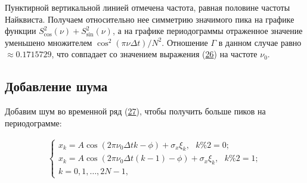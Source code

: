\documentclass[12pt]{article}
\newcommand{\hl}[1]{(\hyperlink{eq:#1}{#1})}
\newcommand{\sd}[1]{\hypertarget{skip:#1}{\vspace{-10pt}}}
\begin{document}
\vspace{10pt}
\begin{minipage}[h]{\linewidth}
\end{minipage}

\vspace{\baselineskip}

Пунктирной вертикальной линией отмечена частота, равная половине частоты Найквиста. Получаем относительно нее симметрию значимого пика на графике функции $ S_{\cos}^2(\nu) + S_{\sin}^2(\nu) $, а на графике периодограммы отраженное значение уменьшено множителем $ \cos^2(\pi \nu \Delta t) / N^2 $. Отношение $ \Gamma $ в данном случае равно $ \approx 0.1715729 $, что совпадает со значением выражения \hl{26} на частоте $ \nu_{0} $.

\subsection{Добавление шума}

Добавим шум во временной ряд \hl{27}, чтобы получить больше пиков на периодограмме:

\sd{29}
\begin{gather}
    \begin{cases}
        x_k = A \cos(2 \pi \nu_{0} \Delta t k - \phi) + \sigma_{x} \xi_{k} , \hspace{8pt} k \% 2 = 0; \\
        x_k = A \cos(2 \pi \nu_{0} \Delta t (k - 1) - \phi) + \sigma_{x} \xi_{k}, \hspace{8pt} k \% 2 = 1; \\
        k = 0, 1, \ldots, 2 N - 1,
    \end{cases}
\end{gather}
\end{document}
